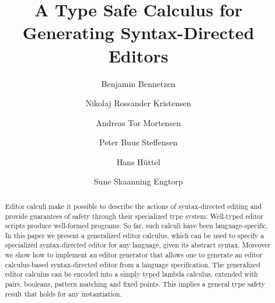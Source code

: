 \documentclass[sigplan,screen]{acmart}
\begin{document}
\title{A Type Safe Calculus for Generating
  Syntax-Directed Editors}


\author{Benjamin Bennetzen}

\author{Nikolaj Rossander Kristensen}

\author{Andreas Tor Mortensen}

\author{Peter Buus Steffensen}


\author{Hans Hüttel}
\author{Sune Skaanning Engtorp}



\renewcommand{\shortauthors}{B. Bennetzen, S.S. Engtorp, H. Hüttel, N.R. Kristensen, A.T. Mortensen and P.B. Steffense}

\begin{abstract}
  Editor calculi make it possible to describe the actions of
  syntax-directed editing and provide guarantees of safety through
  their specialized type system: Well-typed editor scripts produce
  well-formed programs. So far, such calculi have been
  language-specific. In this paper we present a generalized editor
  calculus, which can be used to specify a specialized syntax-directed
  editor for any language, given its abstract syntax. Moreover we show
  how to implement an editor generator that allows one to generate an
  editor calculus-based syntax-directed editor from a language
  specification. The generalized editor calculus can be encoded into a
  simply typed lambda calculus, extended with pairs, booleans, pattern
  matching and fixed points. This implies a general type safety result
  that holds for any instantiation.
\end{abstract}
\end{document}

